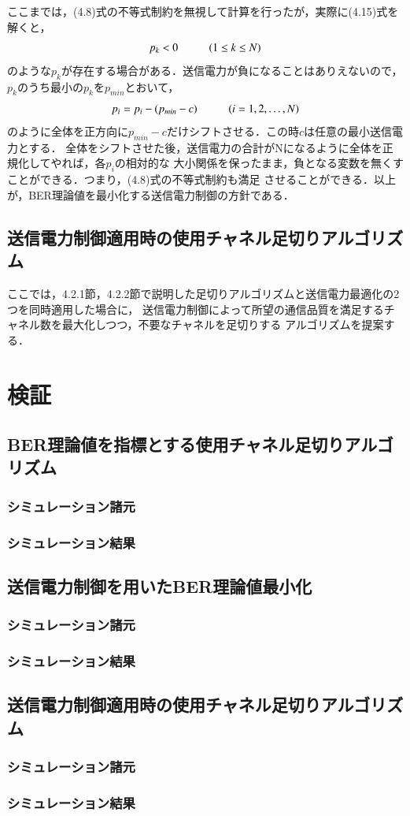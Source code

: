 ここまでは，(4.8)式の不等式制約を無視して計算を行ったが，実際に(4.15)式を解くと，
\begin{equation}
    p_k < 0 \hspace{10mm} (1 \leq k \leq N)
\end{equation}
のような$p_k$が存在する場合がある．送信電力が負になることはありえないので，
$p_k$のうち最小の$p_k$を$p_{min}$とおいて，
\begin{equation}
    p_i = p_i-(p_{min}-c) \hspace{10mm} (i=1,2,\ldots,N)
\end{equation}
のように全体を正方向に$p_{min}-c$だけシフトさせる．この時$c$は任意の最小送信電力とする．
全体をシフトさせた後，送信電力の合計がNになるように全体を正規化してやれば，各$p_i$の相対的な
大小関係を保ったまま，負となる変数を無くすことができる．つまり，(4.8)式の不等式制約も満足
させることができる．以上が，BER理論値を最小化する送信電力制御の方針である．

\subsection{送信電力制御適用時の使用チャネル足切りアルゴリズム}
ここでは，4.2.1節，4.2.2節で説明した足切りアルゴリズムと送信電力最適化の2つを同時適用した場合に，
送信電力制御によって所望の通信品質を満足するチャネル数を最大化しつつ，不要なチャネルを足切りする
アルゴリズムを提案する．



\section{検証}
\subsection{BER理論値を指標とする使用チャネル足切りアルゴリズム}
\subsubsection{シミュレーション諸元}
\subsubsection{シミュレーション結果}
\subsection{送信電力制御を用いたBER理論値最小化}
\subsubsection{シミュレーション諸元}
\subsubsection{シミュレーション結果}
\subsection{送信電力制御適用時の使用チャネル足切りアルゴリズム}
\subsubsection{シミュレーション諸元}
\subsubsection{シミュレーション結果}

